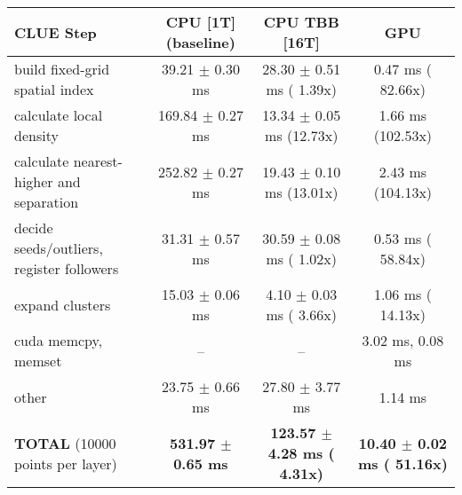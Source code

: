     \begin{tabular}{l|c|c|c}
    \hline
    CLUE Step                                 & CPU [1T] (baseline)         & CPU TBB [16T]                         & GPU                       \\ \hline
    build fixed-grid spatial index            &  39.21 $\pm$  0.30 ms       &  28.30 $\pm$  0.51 ms ( 1.39x)        &   0.47 ms ( 82.66x)       \\
    calculate local density                   & 169.84 $\pm$  0.27 ms       &  13.34 $\pm$  0.05 ms (12.73x)        &   1.66 ms (102.53x)       \\
    calculate nearest-higher and separation   & 252.82 $\pm$  0.27 ms       &  19.43 $\pm$  0.10 ms (13.01x)        &   2.43 ms (104.13x)       \\
    decide seeds/outliers, register followers &  31.31 $\pm$  0.57 ms       &  30.59 $\pm$  0.08 ms ( 1.02x)        &   0.53 ms ( 58.84x)       \\
    expand clusters                           &  15.03 $\pm$  0.06 ms       &   4.10 $\pm$  0.03 ms ( 3.66x)        &   1.06 ms ( 14.13x)       \\ \hline
    cuda memcpy, memset                       & --                          & --                                    &   3.02 ms,   0.08 ms      \\ 
    other                                     &  23.75 $\pm$  0.66 ms       &  27.80 $\pm$  3.77 ms                 &   1.14 ms                 \\ \hline
    \textbf{TOTAL} (10000 points per layer)   & \textbf{531.97 $\pm$  0.65 ms} & \textbf{123.57 $\pm$  4.28 ms ( 4.31x)} & \textbf{ 10.40 $\pm$  0.02 ms ( 51.16x)}  \\
    \hline 
    \end{tabular}
    \linebreak


